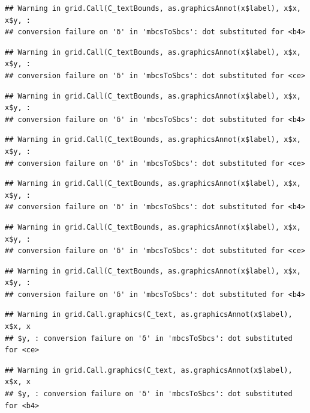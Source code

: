 \documentclass[]{article}
\begin{document}
\begin{verbatim}
## Warning in grid.Call(C_textBounds, as.graphicsAnnot(x$label), x$x, x$y, :
## conversion failure on 'δ' in 'mbcsToSbcs': dot substituted for <b4>
\end{verbatim}

\begin{verbatim}
## Warning in grid.Call(C_textBounds, as.graphicsAnnot(x$label), x$x, x$y, :
## conversion failure on 'δ' in 'mbcsToSbcs': dot substituted for <ce>
\end{verbatim}

\begin{verbatim}
## Warning in grid.Call(C_textBounds, as.graphicsAnnot(x$label), x$x, x$y, :
## conversion failure on 'δ' in 'mbcsToSbcs': dot substituted for <b4>
\end{verbatim}

\begin{verbatim}
## Warning in grid.Call(C_textBounds, as.graphicsAnnot(x$label), x$x, x$y, :
## conversion failure on 'δ' in 'mbcsToSbcs': dot substituted for <ce>
\end{verbatim}

\begin{verbatim}
## Warning in grid.Call(C_textBounds, as.graphicsAnnot(x$label), x$x, x$y, :
## conversion failure on 'δ' in 'mbcsToSbcs': dot substituted for <b4>
\end{verbatim}

\begin{verbatim}
## Warning in grid.Call(C_textBounds, as.graphicsAnnot(x$label), x$x, x$y, :
## conversion failure on 'δ' in 'mbcsToSbcs': dot substituted for <ce>
\end{verbatim}

\begin{verbatim}
## Warning in grid.Call(C_textBounds, as.graphicsAnnot(x$label), x$x, x$y, :
## conversion failure on 'δ' in 'mbcsToSbcs': dot substituted for <b4>
\end{verbatim}

\begin{verbatim}
## Warning in grid.Call.graphics(C_text, as.graphicsAnnot(x$label), x$x, x
## $y, : conversion failure on 'δ' in 'mbcsToSbcs': dot substituted for <ce>
\end{verbatim}

\begin{verbatim}
## Warning in grid.Call.graphics(C_text, as.graphicsAnnot(x$label), x$x, x
## $y, : conversion failure on 'δ' in 'mbcsToSbcs': dot substituted for <b4>
\end{verbatim}
\end{document}
